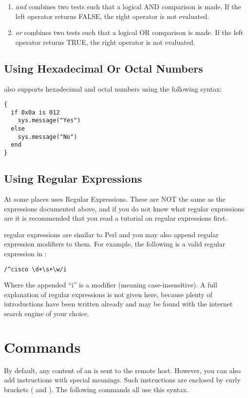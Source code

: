 \begin{enumerate}
\item {\it and} combines two tests such that a logical AND comparison is made. 
If the left operator returns FALSE, the right operator is not evaluated.
\item {\it or} combines two tests such that a logical OR comparison is made. 
If the left operator returns TRUE, the right operator is not evaluated. 
\end{enumerate}


\subsection{Using Hexadecimal Or Octal Numbers}

\product also supports hexadecimal and octal numbers using the following 
syntax: 

\begin{lstlisting}
{
  if 0x0a is 012
    sys.message("Yes")
  else
    sys.message("No")
  end
}
\end{lstlisting}


\subsection{Using Regular Expressions}

At some places \product uses Regular Expressions. These are NOT the same as 
the expressions documented above, and if you do not know what regular 
expressions are it is recommended that you read a tutorial on regular 
expressions first.

\product regular expressions are similar to Perl and you may also append 
regular expression modifiers to them. For example, the following is a valid 
regular expression in \product: 

\begin{lstlisting}
/^cisco \d+\s+\w/i
\end{lstlisting}

Where the appended ``i'' is a modifier (meaning case-insensitive). A full 
explanation of regular expressions is not given here, because plenty of 
introductions have been written already and may be found with the internet 
search engine of your choice.


\section{\product Commands}

By default, any content of an \product is sent to the remote host. However, 
you can also add instructions with special meanings. Such instructions are 
enclosed by curly brackets ({ and }). The following commands all use this 
syntax. 

